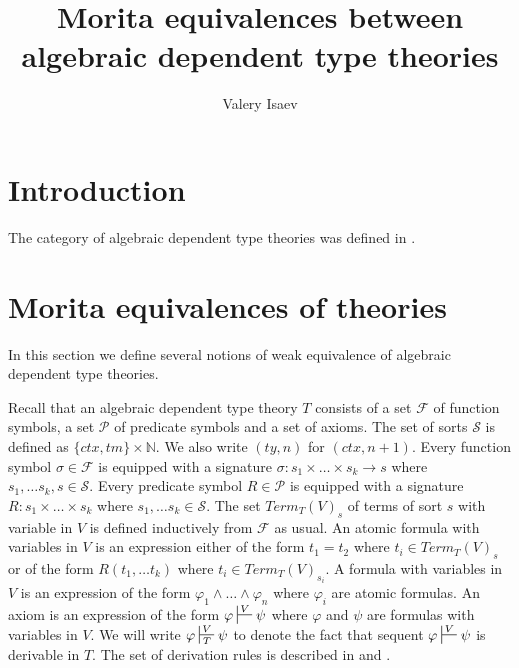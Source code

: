 \documentclass[reqno]{amsart}
\theoremstyle{definition}
\theoremstyle{remark}
\numberwithin{figure}{section}
\begin{document}
\title{Morita equivalences between algebraic dependent type theories}

\author{Valery Isaev}

\begin{abstract}
\end{abstract}

\maketitle

\section{Introduction}

The category of algebraic dependent type theories was defined in \cite{alg-tt}.

\section{Morita equivalences of theories}

In this section we define several notions of weak equivalence of algebraic dependent type theories.

Recall that an algebraic dependent type theory $T$ consists of a set $\mathcal{F}$ of function symbols, a set $\mathcal{P}$ of predicate symbols and a set of axioms.
The set of sorts $\mathcal{S}$ is defined as $\{ ctx, tm \} \times \mathbb{N}$.
We also write $(ty,n)$ for $(ctx,n+1)$.
Every function symbol $\sigma \in \mathcal{F}$ is equipped with a signature $\sigma : s_1 \times \ldots \times s_k \to s$ where $s_1, \ldots s_k, s \in \mathcal{S}$.
Every predicate symbol $R \in \mathcal{P}$ is equipped with a signature $R : s_1 \times \ldots \times s_k$ where $s_1, \ldots s_k \in \mathcal{S}$.
The set $Term_T(V)_s$ of terms of sort $s$ with variable in $V$ is defined inductively from $\mathcal{F}$ as usual.
An atomic formula with variables in $V$ is an expression either of the form $t_1 = t_2$  where $t_i \in Term_T(V)_s$ or of the form $R(t_1, \ldots t_k)$ where $t_i \in Term_T(V)_{s_i}$.
A formula with variables in $V$ is an expression of the form $\varphi_1 \land \ldots \land \varphi_n$ where $\varphi_i$ are atomic formulas.
An axiom is an expression of the form $\varphi \sststile{}{V} \psi$ where $\varphi$ and $\psi$ are formulas with variables in $V$.
We will write $\varphi \sststile{T}{V} \psi$ to denote the fact that sequent $\varphi \sststile{}{V} \psi$ is derivable in $T$.
The set of derivation rules is described in \cite{PHL} and \cite{alg-tt}.
\end{document}
